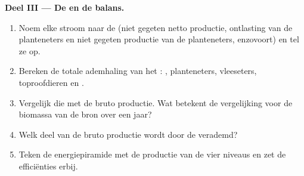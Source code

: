 \begin{problem}
\medskip
\noindent\textbf{Deel III --- De  en de balans.}
\begin{enumerate}[resume]
  \item Noem elke stroom naar de  (niet gegeten netto productie,
        ontlasting van de planteneters en niet gegeten productie van de
        planteneters, enzovoort) en tel ze op.
  \item Bereken de totale ademhaling van het : ,
        planteneters, vleeseters, toproofdieren en .
  \item Vergelijk die met de bruto productie. Wat betekent de
        vergelijking voor de biomassa van de bron over een jaar?
  \item Welk deel van de bruto productie wordt door de 
        verademd?
  \item Teken de energiepiramide met de productie van de vier niveaus en
        zet de efficiënties erbij.
\end{enumerate}


\end{problem}
